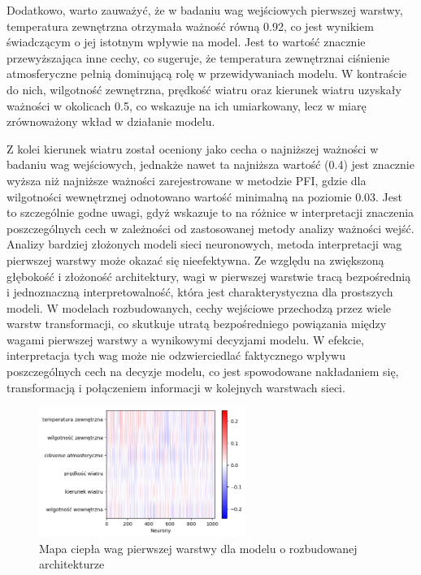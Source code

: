 \documentclass[a4paper,twoside,12pt]{book}
\begin{document}
Dodatkowo, warto zauważyć, że w badaniu wag wejściowych pierwszej warstwy, temperatura zewnętrzna otrzymała ważność równą 0.92, co jest wynikiem świadczącym o jej istotnym wpływie na model. Jest to wartość znacznie przewyższająca inne cechy, co sugeruje, że temperatura zewnętrznai ciśnienie atmosferyczne pełnią dominującą rolę w przewidywaniach modelu. W kontraście do nich, wilgotność zewnętrzna, prędkość wiatru oraz kierunek wiatru uzyskały ważności w okolicach 0.5, co wskazuje na ich umiarkowany, lecz w miarę zrównoważony wkład w działanie modelu.

Z kolei kierunek wiatru został oceniony jako cecha o najniższej ważności w badaniu wag wejściowych, jednakże nawet ta najniższa wartość (0.4) jest znacznie wyższa niż najniższe ważności zarejestrowane w metodzie PFI, gdzie dla wilgotności wewnętrznej odnotowano wartość minimalną na poziomie 0.03. Jest to szczególnie godne uwagi, gdyż wskazuje to na różnice w interpretacji znaczenia poszczególnych cech w zależności od zastosowanej metody analizy ważności wejść.\\

Analizy bardziej złożonych modeli sieci neuronowych, metoda interpretacji wag pierwszej warstwy może okazać się nieefektywna. Ze względu na zwiększoną głębokość i złożoność architektury, wagi w pierwszej warstwie tracą bezpośrednią i jednoznaczną interpretowalność, która jest charakterystyczna dla prostszych modeli. W modelach rozbudowanych, cechy wejściowe przechodzą przez wiele warstw transformacji, co skutkuje utratą bezpośredniego powiązania między wagami pierwszej warstwy a wynikowymi decyzjami modelu. W efekcie, interpretacja tych wag może nie odzwierciedlać faktycznego wpływu poszczególnych cech na decyzje modelu, co jest spowodowane nakładaniem się, transformacją i połączeniem informacji w kolejnych warstwach sieci.
\newpage
\begin{figure}[!h]
	\centering
	\includegraphics[width=0.6\textwidth]{img/heatmap2.png}
	\caption{Mapa ciepła wag pierwszej warstwy dla modelu o rozbudowanej architekturze}
	\label{fig:etykieta-rysunku}
\end{figure}
\end{document}
